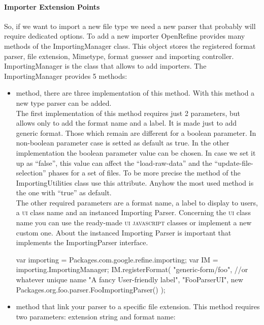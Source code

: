 \paragraph{Importer Extension Points} So, if we want to import a new file type we need a new parser that probably will require dedicated options. To add a new importer OpenRefine provides many methods of the ImportingManager class. This object stores the registered format parser, file extension, Mimetype, format guesser and importing controller. \\
ImportingManager is the class that allows to add importers. The ImportingManager provides 5 methods:
\begin{itemize}
	\item {} method, there are three implementation of this method. With this method a new type parser can be added.\\
	The first implementation of this method requires just 2 parameters, but allows only to add the format name and a label. It is made just to add generic format. Those which remain are different for a boolean parameter. In non-boolean parameter case is setted as default as true. In the other implementation the boolean parameter value can be chosen. In case we set it up as ``false'', this value can affect the ``load-raw-data'' and the ``update-file-selection'' phases for a set of files. To be more precise the  method of the ImportingUtilities class use this attribute. Anyhow the most used method is the one with ``true'' as default. \\
	The other required parameters are a format name, a label to display to users, a \textsc{ui} class name and an instanced Importing Parser. Concerning the \textsc{ui} class name you can use the ready-made \textsc{ui javascript} classes or implement a new custom one. About the instanced Importing Parser is important that implements the ImportingParser interface. 
	\begin{code}
var importing = Packages.com.google.refine.importing;
var IM = importing.ImportingManager; 
IM.registerFormat(
       "generic-form/foo", //or whatever unique name 
       "A fancy User-friendly label",
       "FooParserUI",
       new Packages.org.foo.parser.FooImportingParser()
       );
	\end{code}
	\item {} method that link your parser to a specific file extension. This method requires two parameters: extension string and format name:
	\begin{code}

\end{code}
\end{itemize}
